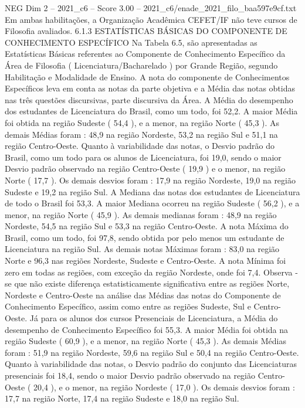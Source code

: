 \begin{textsample}{NEG Dim 2 – 2021\_c6 – Score 3.00 – 2021\_c6/enade\_2021\_filo\_baa597e9cf.txt}
Em ambas habilitações, a Organização Acadêmica CEFET/IF não teve cursos de Filosofia avaliados. 6.1.3 ESTATÍSTICAS BÁSICAS DO COMPONENTE DE CONHECIMENTO ESPECÍFICO Na Tabela 6.5, são apresentadas as Estatísticas Básicas referentes ao Componente de Conhecimento Específico da Área de Filosofia ( Licenciatura/Bacharelado ) por Grande Região, segundo Habilitação e Modalidade de Ensino.
A nota do componente de Conhecimentos Específicos leva em conta as notas da parte objetiva e a Média das notas obtidas nas três questões discursivas, parte discursiva da Área.
A Média do desempenho dos estudantes de Licenciatura do Brasil, como um todo, foi 52,2.
A maior Média foi obtida na região Sudeste ( 54,4 ), e a menor, na região Norte ( 45,3 ).
As demais Médias foram : 48,9 na região Nordeste, 53,2 na região Sul e 51,1 na região Centro-Oeste.
Quanto à variabilidade das notas, o Desvio padrão do Brasil, como um todo para os alunos de Licenciatura, foi 19,0, sendo o maior Desvio padrão observado na região Centro-Oeste ( 19,9 ) e o menor, na região Norte ( 17,7 ).
Os demais desvios foram : 17,9 na região Nordeste, 19,0 na região Sudeste e 19,2 na região Sul.
A Mediana das notas dos estudantes de Licenciatura de todo o Brasil foi 53,3.
A maior Mediana ocorreu na região Sudeste ( 56,2 ), e a menor, na região Norte ( 45,9 ).
As demais medianas foram : 48,9 na região Nordeste, 54,5 na região Sul e 53,3 na região Centro-Oeste.
A nota Máxima do Brasil, como um todo, foi 97,8, sendo obtida por pelo menos um estudante de Licenciatura na região Sul.
As demais notas Máximas foram : 83,0 na região Norte e 96,3 nas regiões Nordeste, Sudeste e Centro-Oeste.
A nota Mínima foi zero em todas as regiões, com exceção da região Nordeste, onde foi 7,4.
Observa -se que não existe diferença estatisticamente significativa entre as regiões Norte, Nordeste e Centro-Oeste na análise das Médias das notas do Componente de Conhecimento Específico, assim como entre as regiões Sudeste, Sul e Centro-Oeste.
Já para os alunos dos cursos Presenciais de Licenciatura, a Média do desempenho de Conhecimento Específico foi 55,3.
A maior Média foi obtida na região Sudeste ( 60,9 ), e a menor, na região Norte ( 45,3 ).
As demais Médias foram : 51,9 na região Nordeste, 59,6 na região Sul e 50,4 na região Centro-Oeste.
Quanto à variabilidade das notas, o Desvio padrão do conjunto das Licenciaturas presenciais foi 18,4, sendo o maior Desvio padrão observado na região Centro-Oeste ( 20,4 ), e o menor, na região Nordeste ( 17,0 ).
Os demais desvios foram : 17,7 na região Norte, 17,4 na região Sudeste e 18,0 na região Sul.

\end{textsample}
